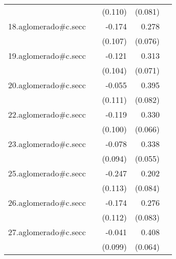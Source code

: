 {\begin{longtable}{l*{4}{D{.}{.}{-1}}}
            &                     &     (0.110)         &     (0.081)         &                     \\
\addlinespace
18.aglomerado#c.secc&                     &      -0.174         &       0.278\sym{***}&                     \\
            &                     &     (0.107)         &     (0.076)         &                     \\
\addlinespace
19.aglomerado#c.secc&                     &      -0.121         &       0.313\sym{***}&                     \\
            &                     &     (0.104)         &     (0.071)         &                     \\
\addlinespace
20.aglomerado#c.secc&                     &      -0.055         &       0.395\sym{***}&                     \\
            &                     &     (0.111)         &     (0.082)         &                     \\
\addlinespace
22.aglomerado#c.secc&                     &      -0.119         &       0.330\sym{***}&                     \\
            &                     &     (0.100)         &     (0.066)         &                     \\
\addlinespace
23.aglomerado#c.secc&                     &      -0.078         &       0.338\sym{***}&                     \\
            &                     &     (0.094)         &     (0.055)         &                     \\
\addlinespace
25.aglomerado#c.secc&                     &      -0.247\sym{*}  &       0.202\sym{*}  &                     \\
            &                     &     (0.113)         &     (0.084)         &                     \\
\addlinespace
26.aglomerado#c.secc&                     &      -0.174         &       0.276\sym{***}&                     \\
            &                     &     (0.112)         &     (0.083)         &                     \\
\addlinespace
27.aglomerado#c.secc&                     &      -0.041         &       0.408\sym{***}&                     \\
            &                     &     (0.099)         &     (0.064)         &                     \\

\end{longtable}}
